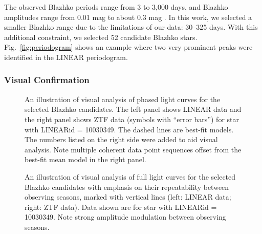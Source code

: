 The observed Blazhko periods range from 3 to 3,000 days, and Blazhko amplitudes range from 0.01 mag to about 0.3 mag \citep{2007MNRAS.377.1263S}. In this work, we selected a smaller Blazhko range due to the limitations of our data: 30--325 days. 
With this additional constraint, we selected 52 candidate Blazhko stars. 
Fig.~\ref{fig:periodogram} shows an example where two very prominent peaks were identified in the LINEAR periodogram. 



\subsubsection{Visual Confirmation}

\begin{figure}[ht]
  \centering
  \caption{An illustration of visual analysis of phased light curves for the selected Blazhko candidates. The left
    panel shows LINEAR data and the right panel shows ZTF data
    (symbols with ``error bars'') for star with LINEARid = 10030349. The dashed
    lines are best-fit models. The numbers listed on the right side were added to aid  visual analysis. Note
    multiple coherent data point sequences offset from the best-fit mean model in the right panel.}
       \label{fig:phase1}
\end{figure}

\begin{figure}[ht] 
    \centering
       \caption{An illustration of visual analysis of full light curves for the selected Blazhko candidates with emphasis
         on their repeatability between observing seasons, marked with  vertical lines (left: LINEAR data; right: ZTF data). Data
         shown are for star with LINEARid = 10030349. Note strong
         amplitude modulation between observing seasons.}
         \label{fig:phase3}
\end{figure}
       
